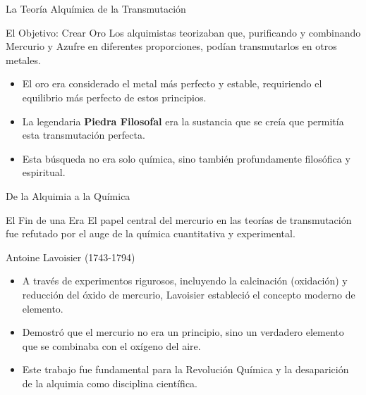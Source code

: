 \begin{frame}{La Teoría Alquímica de la Transmutación}
  \begin{block}{El Objetivo: Crear Oro}
    Los alquimistas teorizaban que, purificando y combinando Mercurio y Azufre
    en diferentes proporciones, podían transmutarlos en otros metales.
  \end{block}

  \pause
  \begin{itemize}
    \item El oro era considerado el metal más perfecto y estable, requiriendo el
      equilibrio más perfecto de estos principios.
    \item La legendaria \textbf{Piedra Filosofal} era la sustancia que se creía
      que permitía esta transmutación perfecta.
    \item Esta búsqueda no era solo química, sino también profundamente
      filosófica y espiritual.
  \end{itemize}
\end{frame}

\begin{frame}{De la Alquimia a la Química}
  \begin{alertblock}{El Fin de una Era}
    El papel central del mercurio en las teorías de transmutación fue refutado
    por el auge de la química cuantitativa y experimental.
  \end{alertblock}

  \begin{block}{Antoine Lavoisier (1743-1794)}
    \begin{itemize}[<+->]
      \item A través de experimentos rigurosos, incluyendo la calcinación
        (oxidación) y reducción del óxido de mercurio, Lavoisier estableció el
        concepto moderno de elemento.
      \item Demostró que el mercurio no era un principio, sino un verdadero
        elemento que se combinaba con el oxígeno del aire.
      \item Este trabajo fue fundamental para la Revolución Química y la
        desaparición de la alquimia como disciplina científica.
    \end{itemize}
  \end{block}
\end{frame}
